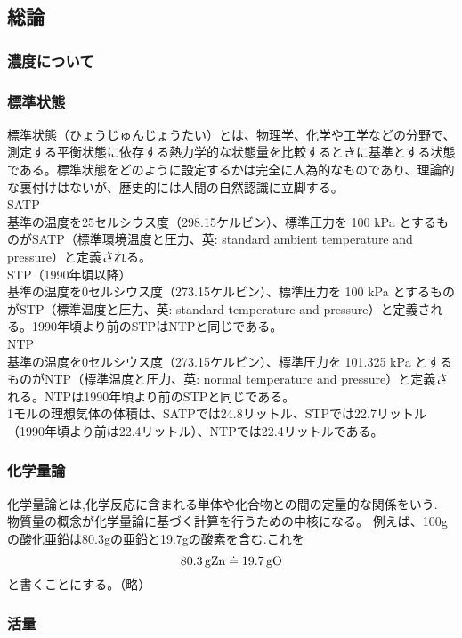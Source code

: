 \documentclass[dvipdfmx,uplatex]{jsarticle}
\begin{document}
\subsection{総論}
\subsubsection{濃度について}
\subsubsection{標準状態}
標準状態（ひょうじゅんじょうたい）とは、物理学、化学や工学などの分野で、測定する平衡状態に依存する熱力学的な状態量を比較するときに基準とする状態である。標準状態をどのように設定するかは完全に人為的なものであり、理論的な裏付けはないが、歴史的には人間の自然認識に立脚する。 \\
{\Large SATP} \\
基準の温度を25セルシウス度（298.15ケルビン）、標準圧力を 100 kPa とするものがSATP（標準環境温度と圧力、英: standard ambient temperature and pressure）と定義される。 \\
{\Large STP（1990年頃以降）} \\
基準の温度を0セルシウス度（273.15ケルビン）、標準圧力を 100 kPa とするものがSTP（標準温度と圧力、英: standard temperature and pressure）と定義される。1990年頃より前のSTPはNTPと同じである。 \\
{\Large NTP} \\
基準の温度を0セルシウス度（273.15ケルビン）、標準圧力を 101.325 kPa とするものがNTP（標準温度と圧力、英: normal temperature and pressure）と定義される。NTPは1990年頃より前のSTPと同じである。 \\
1モルの理想気体の体積は、SATPでは24.8リットル、STPでは22.7リットル（1990年頃より前は22.4リットル）、NTPでは22.4リットルである。

	\subsubsection{化学量論}
化学量論とは,化学反応に含まれる単体や化合物との間の定量的な関係をいう. \\
物質量の概念が化学量論に基づく計算を行うための中核になる。
例えば、100gの酸化亜鉛は80.3gの亜鉛と19.7gの酸素を含む.これを
\[
\ce{80.3gZn} \doteq \ce{19.7gO}
\]
と書くことにする。（略）

\subsubsection{活量}
\end{document}
